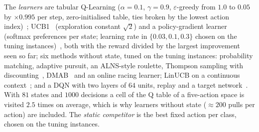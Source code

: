 \documentclass[conference,a4paper]{IEEEtran}
\begin{document}
The \emph{learners} are tabular Q-Learning ($\alpha=0.1$, $\gamma=0.9$, $\varepsilon$-greedy from $1.0$ to $0.05$ by $\times0.995$ per step, zero-initialised table, ties broken by the lowest action index)~\cite{WatkinsDayan1992}; UCB1~\cite{AuerEtal2002} (exploration constant $\sqrt2$) and a policy-gradient learner (softmax preferences per state; learning rate in $\{0.03,0.1,0.3\}$ chosen on the tuning instances)~\cite{Williams1992,SuttonBarto2018}, both with the reward divided by the largest improvement seen so far; six methods without state, tuned on the tuning instances: probability matching, adaptive pursuit, an ALNS-style roulette, Thompson sampling with discounting~\cite{Russo2018}, DMAB~\cite{DaCostaEtal2008} and an online racing learner; LinUCB on a continuous context~\cite{LiEtAl2010}; and a DQN with two layers of $64$ units, replay and a target network~\cite{MnihEtAl2015}.
With $81$ states and $1000$ decisions a cell of the Q table of a five-action space is visited $2.5$ times on average, which is why learners without state ($\approx200$ pulls per action) are included.
The \emph{static competitor} is the best fixed action per class, chosen on the tuning instances.
\end{document}
